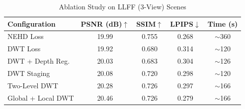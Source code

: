 \begin{table}[!t]
\caption{Ablation Study on LLFF (3-View) Scenes}
\label{tab:ablation}
\centering
\begin{tabular}{lcccc}
\hline
Configuration        & PSNR (dB)$\uparrow$ & SSIM$\uparrow$ & LPIPS$\downarrow$ & Time (s) \\ \hline
NEHD Loss            & 19.99               & 0.755          & 0.268             & $\sim$360 \\
DWT Loss             & 19.92               & 0.680          & 0.314             & $\sim$120 \\
DWT + Depth Reg.     & 20.03               & 0.683          & 0.304             & $\sim$126 \\
DWT Staging          & 20.08               & 0.720          & 0.298             & $\sim$120 \\
Two-Level DWT        & 20.28               & 0.726          & 0.297             & $\sim$166 \\
Global + Local DWT   & 20.46               & 0.726          & 0.279             & $\sim$166 \\ \hline
\end{tabular}
\end{table}

